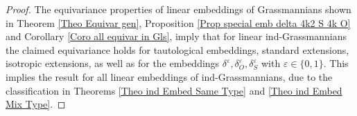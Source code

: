 \documentclass[12pt]{amsart}
\def\eps {\varepsilon}
\begin{document}
\begin{proof}
The equivariance properties of linear embeddings of Grassmannians shown in Theorem \ref{Theo Equivar gen}, Proposition \ref{Prop special emb delta 4k2 S 4k O} and Corollary \ref{Coro all equivar in Gls}, imply that for linear ind-Grassmannians the claimed equivariance holds for tautological embeddings, standard extensions, isotropic extensions, as well as for the embeddings $\delta^\eps,\delta^\eps_O,\delta^\eps_S$ with $\eps\in\{0,1\}$. This implies the result for all linear embeddings of ind-Grassmannians, due to the classification in Theorems \ref{Theo ind Embed Same Type} and \ref{Theo ind Embed Mix Type}.
\end{proof}







%

\end{document}
